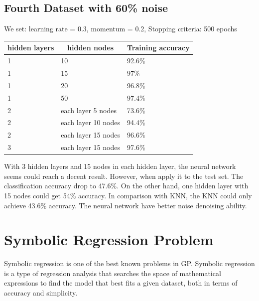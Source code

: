 \documentclass[11pt, a4paper, oneside, openright]{article}
\begin{document}
\subsection{Fourth Dataset with 60\% noise}
We set:  learning rate = 0.3, momentum = 0.2, Stopping criteria: 500 epochs
\begin{table}[H]
\begin{tabular}{|l|l|l|}
\hline
\multicolumn{1}{|c|}{\textbf{hidden layers}} & \multicolumn{1}{c|}{\textbf{hidden nodes}} 
& \multicolumn{1}{c|}{\textbf{Training accuracy}}\\
\hline
1     &10 &92.6\%                                    \\
\hline
1    &15 &97\%                                  \\
\hline
1   &20 &96.8\%                                             \\
\hline
1   &50 &97.4\%                                             \\
\hline
2 &each layer 5 nodes  &73.6\%                                            \\
\hline
2  &each layer 10 nodes &94.4\%                                              \\
\hline
2  &each layer 15 nodes &96.6\%                                              \\
\hline
3 &each layer 15 nodes &97.6\%                                              \\
\hline
\end{tabular}
\end{table}

With 3 hidden layers and 15 nodes in each hidden layer, the neural network seems could reach a decent result. However, when apply it to the test set. The classification accuracy drop to 47.6\%. On the other hand, one hidden layer with 15 nodes could get 54\% accuracy. In comparison with KNN, the KNN could only achieve 43.6\% accuracy. The neural network have better noise denoising ability.

\section{Symbolic Regression Problem}
Symbolic regression is one of the best known problems in GP\cite{koza1992genetic}. Symbolic regression is a type of regression analysis that searches the space of mathematical expressions to find the model that best fits a given dataset, both in terms of accuracy and simplicity.
\end{document}
